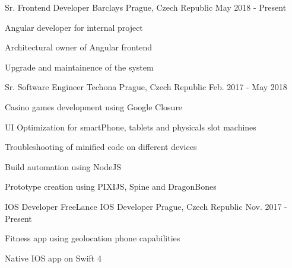 

\begin{cventries}

    \cventry
    {Sr. Frontend Developer} %
    {Barclays} %
    {Prague, Czech Republic} %
    {May 2018 - Present} %
    {
    \begin{cvitems} %
        \item {Angular developer for internal project}
        \item {Architectural owner of Angular frontend}
        \item {Upgrade and maintainence of the system}
    \end{cvitems}
    }
    \cventry
    {Sr. Software Engineer} %
    {Techona} %
    {Prague, Czech Republic} %
    {Feb. 2017 - May 2018} %
    {
    \begin{cvitems} %
        \item {Casino games development using Google Closure}
        \item {UI Optimization for smartPhone, tablets and physicals slot machines}
        \item {Troubleshooting of minified code on different devices}
        \item {Build automation using NodeJS}
        \item {Prototype creation using PIXIJS, Spine and DragonBones}
    \end{cvitems}
    }

    \cventry
    {IOS Developer} %
    {FreeLance IOS Developer} %
    {Prague, Czech Republic} %
    {Nov. 2017 - Present} %
    {
    \begin{cvitems} %
        \item {Fitness app using geolocation phone capabilities}
        \item {Native IOS app on Swift 4}
    \end{cvitems}
    }


\end{cventries}
